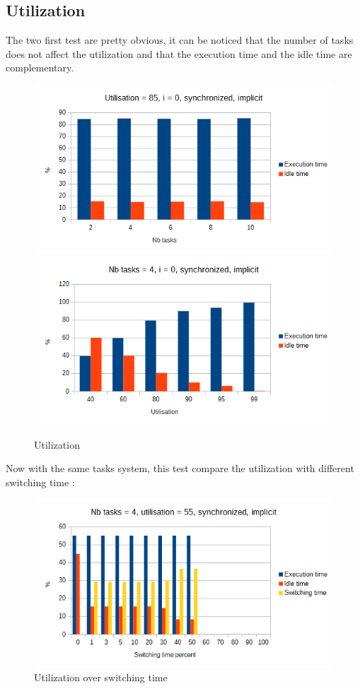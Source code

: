\documentclass[a4paper,12pt]{article}
\begin{document}
\subsection{Utilization}
The two first test  are pretty obvious, it can be noticed that the number of tasks does not affect the utilization and that the execution time and the idle time are complementary.
\begin{figure}[H]
	\begin{center}
		\includegraphics[scale=0.49]{nbtaskstime.png}
		\includegraphics[scale=0.49]{utilisationtime.png}
	\end{center}
	\label{u}
	\caption{Utilization}
\end{figure}

Now with the same tasks system, this test compare the utilization with different switching time :
\begin{figure}[H]
	\begin{center}
		\includegraphics[scale=1]{switchingtime.png}
	\end{center}
	\label{us}
	\caption{Utilization over switching time}
\end{figure}
\end{document}
